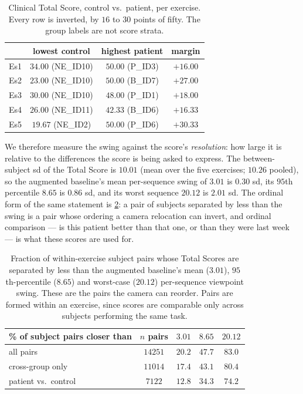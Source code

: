 \documentclass[10pt,twocolumn,letterpaper]{article}
\begin{document}
\begin{table}[h]
\centering\small
\setlength{\tabcolsep}{4pt}
\begin{tabular}{lccc}
\toprule
 & lowest control & highest patient & margin \\
\midrule
Es1 & $34.00$ (NE\_ID10) & $50.00$ (P\_ID3)  & $+16.00$ \\
Es2 & $23.00$ (NE\_ID10) & $50.00$ (B\_ID7)  & $+27.00$ \\
Es3 & $30.00$ (NE\_ID10) & $48.00$ (P\_ID1)  & $+18.00$ \\
Es4 & $26.00$ (NE\_ID11) & $42.33$ (B\_ID6)  & $+16.33$ \\
Es5 & $19.67$ (NE\_ID2)  & $50.00$ (P\_ID6)  & $+30.33$ \\
\bottomrule
\end{tabular}
\caption{Clinical Total Score, control vs.\ patient, per exercise. Every row is inverted, by $16$ to
$30$ points of fifty. The group labels are not score strata.}
\label{tab:supp:inversion}
\end{table}

We therefore measure the swing against the score's \emph{resolution}: how large it is relative to the
differences the score is being asked to express. The between-subject sd of the Total Score is $10.01$
(mean over the five exercises; $10.26$ pooled), so the augmented baseline's mean per-sequence swing of
$3.01$ is $0.30$ sd, its $95$th percentile $8.65$ is $0.86$ sd, and its worst sequence $20.12$ is
$2.01$ sd. The ordinal form of the same statement is \cref{tab:supp:reorder}: a pair of subjects
separated by less than the swing is a pair whose ordering a camera relocation can invert, and ordinal
comparison --- is this patient better than that one, or than they were last week --- is what these
scores are used for.

\begin{table}[h]
\centering\small
\setlength{\tabcolsep}{4pt}
\begin{tabular}{lcccc}
\toprule
\% of subject pairs closer than & $n$ pairs & $3.01$ & $8.65$ & $20.12$ \\
\midrule
all pairs              & $14251$ & $20.2$ & $47.7$ & $83.0$ \\
cross-group only       & $11014$ & $17.4$ & $43.1$ & $80.4$ \\
patient vs.\ control   & $7122$  & $12.8$ & $34.3$ & $74.2$ \\
\bottomrule
\end{tabular}
\caption{Fraction of within-exercise subject pairs whose Total Scores are separated by less than the
augmented baseline's mean ($3.01$), $95$th-percentile ($8.65$) and worst-case ($20.12$) per-sequence
viewpoint swing. These are the pairs the camera can reorder. Pairs are formed within an exercise, since
scores are comparable only across subjects performing the same task.}
\label{tab:supp:reorder}
\end{table}
\end{document}
